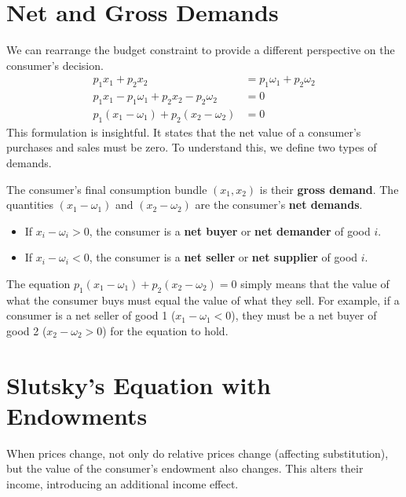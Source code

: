 \section{Net and Gross Demands}

We can rearrange the budget constraint to provide a different perspective on the consumer's decision.
\begin{align*}
p_1 x_1 + p_2 x_2 &= p_1 \omega_1 + p_2 \omega_2 \\
p_1 x_1 - p_1 \omega_1 + p_2 x_2 - p_2 \omega_2 &= 0 \\
p_1(x_1 - \omega_1) + p_2(x_2 - \omega_2) &= 0
\end{align*}
This formulation is insightful. It states that the net value of a consumer's purchases and sales must be zero. To understand this, we define two types of demands.

\begin{definition}
The consumer's final consumption bundle $(x_1, x_2)$ is their \textbf{gross demand}. 
The quantities $(x_1 - \omega_1)$ and $(x_2 - \omega_2)$ are the consumer's \textbf{net demands}.
\end{definition}

\begin{itemize}
    \item If $x_i - \omega_i > 0$, the consumer is a \textbf{net buyer} or \textbf{net demander} of good $i$.
    \item If $x_i - \omega_i < 0$, the consumer is a \textbf{net seller} or \textbf{net supplier} of good $i$.
\end{itemize}

The equation $p_1(x_1 - \omega_1) + p_2(x_2 - \omega_2) = 0$ simply means that the value of what the consumer buys must equal the value of what they sell. For example, if a consumer is a net seller of good 1 ($x_1 - \omega_1 < 0$), they must be a net buyer of good 2 ($x_2 - \omega_2 > 0$) for the equation to hold.

\section{Slutsky's Equation with Endowments}

When prices change, not only do relative prices change (affecting substitution), but the value of the consumer's endowment also changes. This alters their income, introducing an additional income effect.

